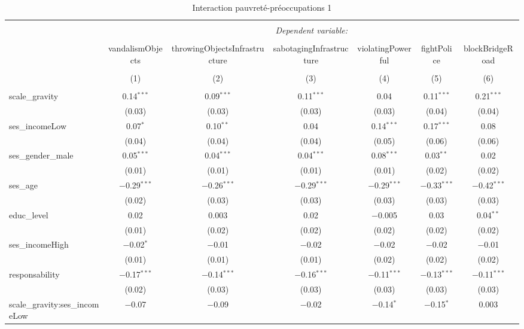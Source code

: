 \documentclass[
]{article}
\begin{document}
\begin{sidewaystable}[!htbp] \centering 
  \caption{Interaction pauvreté-préoccupations 1} 
  \label{} 
\begin{tabular}{@{\extracolsep{1pt}}lcccccc} 
\\[-1.8ex]\hline 
\hline \\[-1.8ex] 
 & \multicolumn{6}{c}{\textit{Dependent variable:}} \\ 
\cline{2-7} 
\\[-1.8ex] & vandalismObjects & throwingObjectsInfrastructure & sabotagingInfrastructure & violatingPowerful & fightPolice & blockBridgeRoad \\ 
\\[-1.8ex] & (1) & (2) & (3) & (4) & (5) & (6)\\ 
\hline \\[-1.8ex] 
 scale\_gravity & 0.14$^{***}$ & 0.09$^{***}$ & 0.11$^{***}$ & 0.04 & 0.11$^{***}$ & 0.21$^{***}$ \\ 
  & (0.03) & (0.03) & (0.03) & (0.03) & (0.04) & (0.04) \\ 
  ses\_incomeLow & 0.07$^{*}$ & 0.10$^{**}$ & 0.04 & 0.14$^{***}$ & 0.17$^{***}$ & 0.08 \\ 
  & (0.04) & (0.04) & (0.04) & (0.05) & (0.06) & (0.06) \\ 
  ses\_gender\_male & 0.05$^{***}$ & 0.04$^{***}$ & 0.04$^{***}$ & 0.08$^{***}$ & 0.03$^{**}$ & 0.02 \\ 
  & (0.01) & (0.01) & (0.01) & (0.01) & (0.02) & (0.02) \\ 
  ses\_age & $-$0.29$^{***}$ & $-$0.26$^{***}$ & $-$0.29$^{***}$ & $-$0.29$^{***}$ & $-$0.33$^{***}$ & $-$0.42$^{***}$ \\ 
  & (0.02) & (0.03) & (0.03) & (0.03) & (0.03) & (0.03) \\ 
  educ\_level & 0.02 & 0.003 & 0.02 & $-$0.005 & 0.03 & 0.04$^{**}$ \\ 
  & (0.01) & (0.02) & (0.02) & (0.02) & (0.02) & (0.02) \\ 
  ses\_incomeHigh & $-$0.02$^{*}$ & $-$0.01 & $-$0.02 & $-$0.02 & $-$0.02 & $-$0.01 \\ 
  & (0.01) & (0.01) & (0.01) & (0.02) & (0.02) & (0.02) \\ 
  responsability & $-$0.17$^{***}$ & $-$0.14$^{***}$ & $-$0.16$^{***}$ & $-$0.11$^{***}$ & $-$0.13$^{***}$ & $-$0.11$^{***}$ \\ 
  & (0.02) & (0.03) & (0.03) & (0.03) & (0.03) & (0.03) \\ 
  scale\_gravity:ses\_incomeLow & $-$0.07 & $-$0.09 & $-$0.02 & $-$0.14$^{*}$ & $-$0.15$^{*}$ & 0.003 \\ 

\end{tabular}
\end{sidewaystable}
\end{document}
